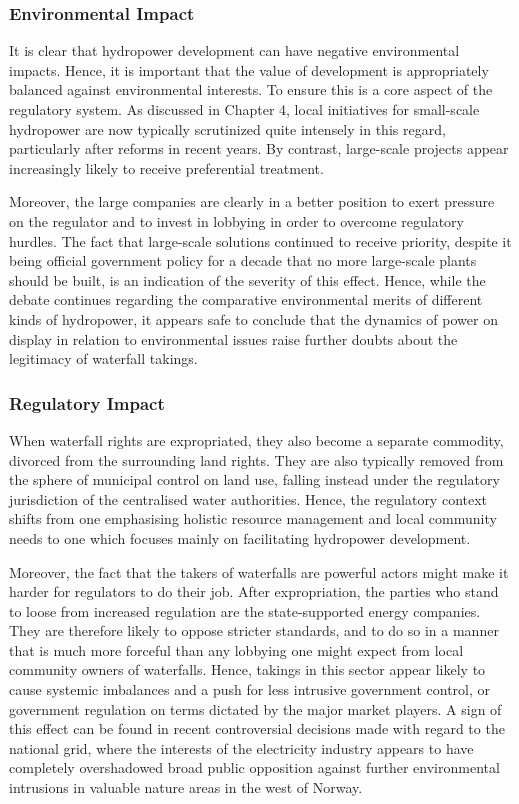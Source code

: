 \subsubsection{Environmental Impact}\label{sec:5:7:6}

It is clear that hydropower development can have negative environmental impacts. Hence, it is important that the value of development is appropriately balanced against environmental interests. To ensure this is a core aspect of the regulatory system. As discussed in Chapter 4, local initiatives for small-scale hydropower are now typically scrutinized quite intensely in this regard, particularly after reforms in recent years. By contrast, large-scale projects appear increasingly likely to receive preferential treatment. %
 
Moreover, the large companies are clearly in a better position to exert pressure on the regulator and to invest in lobbying in order to overcome regulatory hurdles. The fact that large-scale solutions continued to receive priority, despite it being official government policy for a decade that no more large-scale plants should be built, is an indication of the severity of this effect. Hence, while the debate continues regarding the comparative environmental merits of different kinds of hydropower, it appears safe to conclude that the dynamics of power on display in relation to environmental issues raise further doubts about the legitimacy of waterfall takings.

\subsubsection{Regulatory Impact}\label{sec:5:7:7}

When waterfall rights are expropriated, they also become a separate commodity, divorced from the surrounding land rights. They are also typically removed from the sphere of municipal control on land use, falling instead under the regulatory jurisdiction of the centralised water authorities. Hence, the regulatory context shifts from one emphasising holistic resource management and local community needs to one which focuses mainly on facilitating hydropower development.

Moreover, the fact that the takers of waterfalls are powerful actors might make it harder for regulators to do their job. After expropriation, the parties who stand to loose from increased regulation are the state-supported energy companies. They are therefore likely to oppose stricter standards, and to do so in a manner that is much more forceful than any lobbying one might expect from local community owners of waterfalls. Hence, takings in this sector appear likely to cause systemic imbalances and a push for less intrusive government control, or government regulation on terms dictated by the major market players. A sign of this effect can be found in recent controversial decisions made with regard to the national grid, where the interests of the electricity industry appears to have completely overshadowed broad public opposition against further environmental intrusions in valuable nature areas in the west of Norway.

